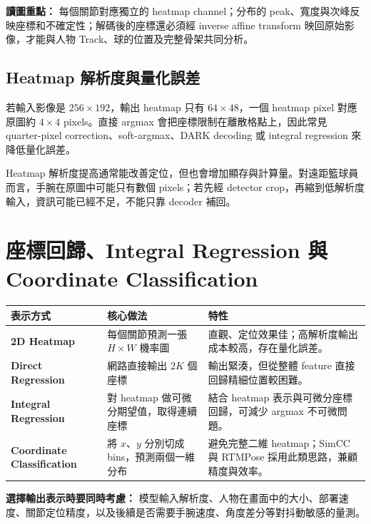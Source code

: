 \documentclass[11pt,a4paper,oneside]{report}
\begin{document}
\begin{plainBox}
\textbf{讀圖重點：}\quad
每個關節對應獨立的 heatmap channel；分布的 peak、寬度與次峰反映座標和不確定性；解碼後的座標還必須經 inverse affine transform 映回原始影像，才能與人物 Track、球的位置及完整骨架共同分析。
\end{plainBox}

\subsection{Heatmap 解析度與量化誤差}


若輸入影像是 $256\times192$，輸出 heatmap 只有 $64\times48$，一個 heatmap pixel 對應原圖約 $4\times4$ pixels。直接 argmax 會把座標限制在離散格點上，因此常見 quarter-pixel correction、soft-argmax、DARK decoding 或 integral regression 來降低量化誤差。

Heatmap 解析度提高通常能改善定位，但也會增加顯存與計算量。對遠距籃球員而言，手腕在原圖中可能只有數個 pixels；若先經 detector crop，再縮到低解析度輸入，資訊可能已經不足，不能只靠 decoder 補回。

\section{座標回歸、Integral Regression 與 Coordinate Classification}

\begin{tabularx}{\textwidth}{>{\bfseries}p{3.5cm} Y Y}
\toprule
表示方式 & 核心做法 & 特性 \\
\midrule
2D Heatmap & 每個關節預測一張 $H\times W$ 機率圖 & 直觀、定位效果佳；高解析度輸出成本較高，存在量化誤差。\\
Direct Regression & 網路直接輸出 $2K$ 個座標 & 輸出緊湊，但從整體 feature 直接回歸精細位置較困難。\\
Integral Regression & 對 heatmap 做可微分期望值，取得連續座標 & 結合 heatmap 表示與可微分座標回歸，可減少 argmax 不可微問題。\\
Coordinate Classification & 將 $x$、$y$ 分別切成 bins，預測兩個一維分布 & 避免完整二維 heatmap；SimCC 與 RTMPose 採用此類思路，兼顧精度與效率。\\
\bottomrule
\end{tabularx}

\begin{plainBox}
\textbf{選擇輸出表示時要同時考慮：}\quad
模型輸入解析度、人物在畫面中的大小、部署速度、關節定位精度，以及後續是否需要手腕速度、角度差分等對抖動敏感的量測。
\end{plainBox}
\end{document}
